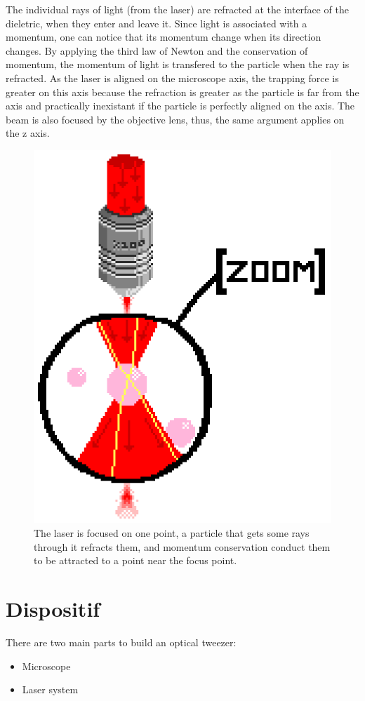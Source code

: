 \documentclass[a4paper,12pt,twoside]{article}	%
\begin{document}
The individual rays of light (from the laser) are refracted at the interface of the dieletric, when they enter and leave it.
Since light is associated with a momentum, one can notice that its momentum change when its direction changes.
By applying the third law of Newton and the conservation of momentum, the momentum of light is transfered to the particle when the ray is refracted.
As the laser is aligned on the microscope axis, the trapping force is greater on this axis because
 the refraction is greater as the particle is far from the axis and practically inexistant if the particle is perfectly aligned on the axis.
The beam is also focused by the objective lens, thus, the same argument applies on the z axis.



\begin{figure}[h]
	\begin{center}
	\includegraphics[width=0.5\linewidth,angle=0]{./figures/lazor_zoom}
	\caption{The laser is focused on one point, a particle that gets some rays through it refracts them, and momentum conservation conduct them to be attracted to a point near the focus point.} \label{fig:theory}
	\end{center}
\end{figure}

\section{Dispositif}
There are two main parts to build an optical tweezer:
\begin{itemize}
	\item Microscope
	\item Laser system
\end{itemize}
\end{document}
